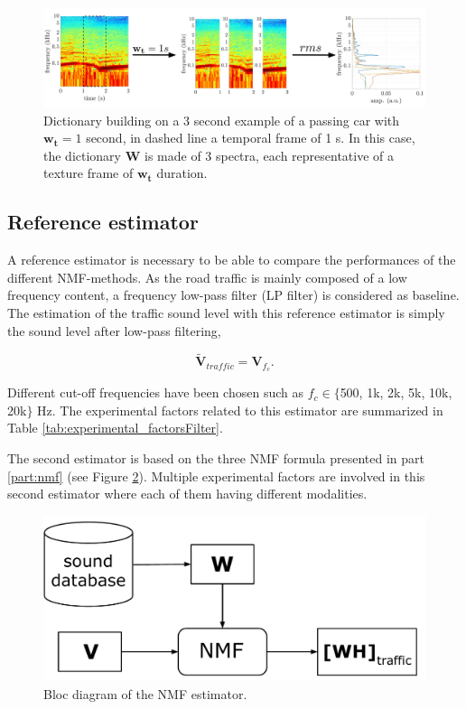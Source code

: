 \documentclass[review,5p,twocolumn,sort&compress,times]{elsarticle}
\begin{document}
\begin{figure}[t]
\centering
\includegraphics[width=\linewidth]{figures/extractionDictionary3.pdf}
\caption{Dictionary building on a 3 second example of a passing car with $\mathbf{w_t} = 1$ second, in dashed line a temporal frame of 1 s. In this case, the dictionary $\mathbf{W}$ is made of 3 spectra, each representative of a texture frame of $\mathbf{w_t}$ duration.}
\label{fig:example_dictionary}
\end{figure}

\subsection{Reference estimator}

A reference estimator is necessary to be able to compare the performances of the different NMF-methods. As the road traffic is mainly composed of a low frequency content, a frequency low-pass filter (LP filter) is considered as baseline. The estimation of the traffic sound level with this reference estimator is simply the sound level after low-pass filtering, 

\begin{equation}
\mathbf{\tilde{V}}_{traffic} = \mathbf{V}_{f_c}.
\end{equation}

Different cut-off frequencies have been chosen such as $f_c \in \lbrace$500, 1k, 2k, 5k, 10k, 20k$\rbrace$ Hz. The experimental factors related to this estimator are summarized in Table \ref{tab:experimental_factorsFilter}.

The second estimator is based on the three NMF formula presented in part \ref{part:nmf} (see Figure \ref{fig:bloc_diagram_nmf}). Multiple experimental factors are involved in this second estimator where each of them having different modalities.

\begin{figure}[t]
\centering
\includegraphics[width=.9\linewidth]{figures/bloc_diagram_NMF_EN_2.pdf}
\caption{Bloc diagram of the NMF estimator.}
\label{fig:bloc_diagram_nmf}
\end{figure}
\end{document}
